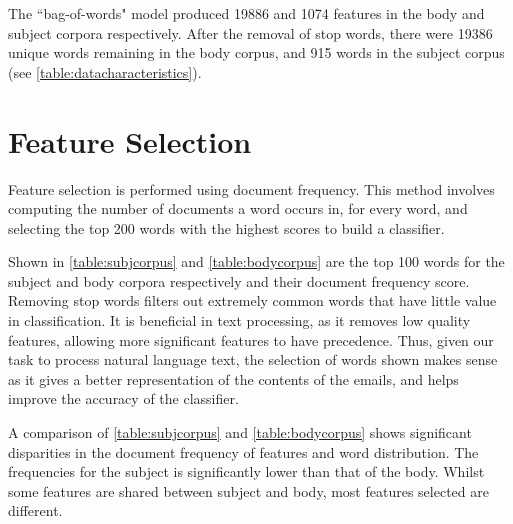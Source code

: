 \documentclass[10pt, a4paper]{article}
\begin{document}
The ``bag-of-words" model produced 19886 and 1074 features in the body and subject corpora respectively. After the removal of stop words, there were 19386 unique words remaining in the body corpus, and 915 words in the subject corpus (see \autoref{table:datacharacteristics}).

\section{Feature Selection}

Feature selection is performed using document frequency. This method involves computing the number of documents a word occurs in, for every word, and selecting the top 200 words with the highest scores to build a classifier.

Shown in \autoref{table:subjcorpus} and \autoref{table:bodycorpus} are the top 100 words for the subject and body corpora respectively and their document frequency score. Removing stop words filters out extremely common words that have little value in classification. It is beneficial in text processing, as it removes low quality features, allowing more significant features to have precedence. Thus, given our task to process natural language text, the selection of words shown makes sense as it gives a better representation of the contents of the emails, and helps improve the accuracy of the classifier. %

A comparison of \autoref{table:subjcorpus} and \autoref{table:bodycorpus} shows significant disparities in the document frequency of features and word distribution. The frequencies for the subject is significantly lower than that of the body. Whilst some features are shared between subject and body, most features selected are different.
\end{document}
